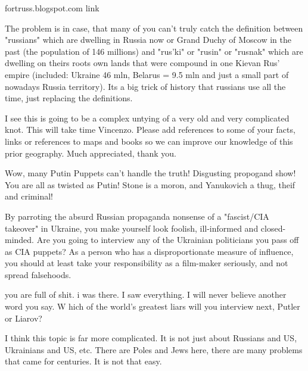 \begin{itemize}
\begin{itemize}

fortruss.blogspot.com link


The problem is in case, that many of you can't truly catch the definition
between "russians" which are dwelling in Russia now or Grand Duchy of Moscow in
the past (the population of 146 millions) and "rus'ki" or "rusin" or "rusnak"
which are dwelling on theirs roots own lands that were compound in one Kievan
Rus' empire (included: Ukraine 46 mln, Belarus = 9.5 mln and just a small part
of nowadays Russia territory). Its a big trick of history that russians use all
the time, just replacing the definitions.


I see this is going to be a complex untying of a very old and very complicated
knot. This will take time Vincenzo. Please add references to some of your
facts, links or references to maps and books so we can improve our knowledge of
this prior geography. Much appreciated, thank you.


Wow, many Putin Puppets can't handle the truth! Disgusting propogand show! You
are all as twisted as Putin! Stone is a moron, and Yanukovich a thug, theif and
criminal!


\end{itemize} %


By parroting the absurd Russian propaganda nonsense of a "fascist/CIA takeover"
in Ukraine, you make yourself look foolish, ill-informed and closed-minded. Are
you going to interview any of the Ukrainian politicians you pass off as CIA
puppets? As a person who has a disproportionate measure of influence, you
should at least take your responsibility as a film-maker seriously, and not
spread falsehoods.


you are full of shit. i was there. I saw everything. I will never believe
another word you say. W hich of the world's greatest liars will you interview
next, Putler or Liarov?



I think this topic is far more complicated. It is not just about Russians and
US, Ukrainians and US, etc. There are Poles and Jews here, there are many
problems that came for centuries. It is not that easy.


\end{itemize}
